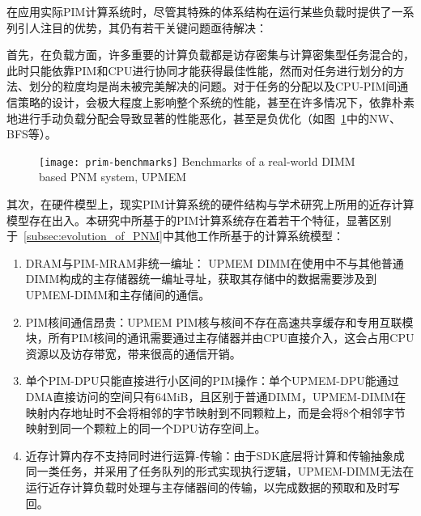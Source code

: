     在应用实际PIM计算系统时，尽管其特殊的体系结构在运行某些负载时提供了一系列引人注目的优势，其仍有若干关键问题亟待解决：
   
    首先，在负载方面，许多重要的计算负载都是访存密集与计算密集型任务混合的\citep{boroumand_lazypim_2017}，此时只能依靠PIM和CPU进行协同才能获得最佳性能，然而对任务进行划分的方法、划分的粒度均是尚未被完美解决的问题。对于任务的分配以及CPU-PIM间通信策略的设计，会极大程度上影响整个系统的性能，甚至在许多情况下，依靠朴素地进行手动负载分配会导致显著的性能恶化，甚至是负优化（如图~\ref{fig:prim_benchmarks}中的NW、BFS等）。
    
    \begin{figure}[!htbp]
        \centering
        \texttt{[image: prim-benchmarks]}
        {\quad Benchmarks of a real-world DIMM based PNM system, UPMEM\citep{gomez-luna_benchmarking_2021}}
        \label{fig:prim_benchmarks}
    \end{figure}
    
    其次，在硬件模型上，现实PIM计算系统的硬件结构与学术研究上所用的近存计算模型存在出入。本研究中所基于的PIM计算系统存在着若干个特征，显著区别于~\ref{subsec:evolution_of_PNM}中其他工作所基于的计算系统模型：
    
    \begin{enumerate}
        \item DRAM与PIM-MRAM非统一编址： UPMEM DIMM在使用中不与其他普通DIMM构成的主存储器统一编址寻址，获取其存储中的数据需要涉及到UPMEM-DIMM和主存储间的通信。
        \item PIM核间通信昂贵：UPMEM PIM核与核间不存在高速共享缓存和专用互联模块，所有PIM核间的通讯需要通过主存储器并由CPU直接介入，这会占用CPU资源以及访存带宽，带来很高的通信开销。
        \item 单个PIM-DPU只能直接进行小区间的PIM操作：单个UPMEM-DPU能通过DMA直接访问的空间只有64MiB，且区别于普通DIMM，UPMEM-DIMM在映射内存地址时不会将相邻的字节映射到不同颗粒上，而是会将8个相邻字节映射到同一个颗粒上的同一个DPU访存空间上。
        \item 近存计算内存不支持同时进行运算-传输：由于SDK底层将计算和传输抽象成同一类任务，并采用了任务队列的形式实现执行逻辑，UPMEM-DIMM无法在运行近存计算负载时处理与主存储器间的传输，以完成数据的预取和及时写回。
    \end{enumerate}

